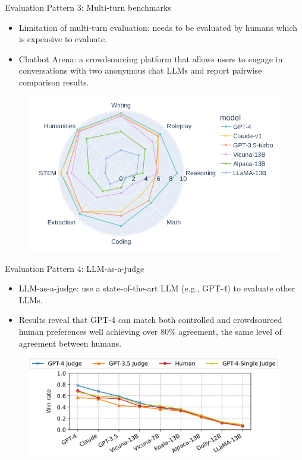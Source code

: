 \documentclass[handout]{beamer}
\begin{document}
\begin{frame}{Evaluation Pattern 3: Multi-turn benchmarks}
\begin{scriptsize}
\begin{itemize}
\item Limitation of multi-turn evaluation: needs to be evaluated by humans which is expensive to evaluate.
\item Chatbot Arena: a crowdsourcing platform that allows users to engage in conversations with two anonymous chat LLMs and report pairwise comparison results.
\end{itemize}

      \begin{figure}[h]
	\includegraphics[scale = 0.3]{pics/mtbench.png}
\end{figure}


\end{scriptsize}
\end{frame}


\begin{frame}{Evaluation Pattern 4: LLM-as-a-judge}
\begin{scriptsize}
\begin{itemize}
\item LLM-as-a-judge: use a state-of-the-art LLM (e.g., GPT-4) to evaluate other LLMs.
\item Results reveal that GPT-4 can match both controlled and crowdsourced human preferences well achieving over 80\% agreement, the same level of agreement between humans.
\end{itemize}
\end{scriptsize}

     \begin{figure}[h]
	\includegraphics[scale = 0.28]{pics/mtbenchex2.png}
\end{figure}
\end{frame}
\end{document}
